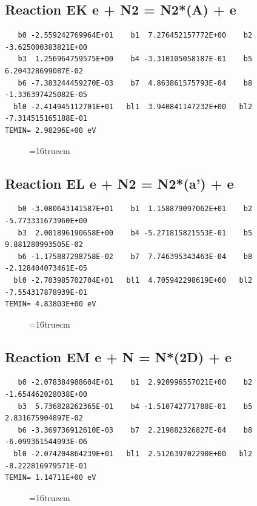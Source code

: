 \documentclass[12pt,dvipdfm]{article}
\begin{document}
\subsection{
Reaction EK e + N2 = N2*(A) + e}
\begin{small}\begin{verbatim}
   b0 -2.559242769964E+01    b1  7.276452157772E+00    b2 -3.625000383821E+00
   b3  1.256964759575E+00    b4 -3.310105058187E-01    b5  6.204328699087E-02
   b6 -7.383244459270E-03    b7  4.863861575793E-04    b8 -1.336397425082E-05
  bl0 -2.414945112701E+01   bl1  3.940841147232E+00   bl2 -7.314515165188E-01
TEMIN= 2.98296E+00 eV
   \end{verbatim}\end{small}
\begin{figure}[h!]
\label{n2rates}
\epsfxsize=16truecm
\end{figure}
\newpage

\subsection{
Reaction EL e + N2 = N2*(a') + e}
\begin{small}\begin{verbatim}
   b0 -3.080643141587E+01    b1  1.158879097062E+01    b2 -5.773331673960E+00
   b3  2.001896190658E+00    b4 -5.271815821553E-01    b5  9.881280993505E-02
   b6 -1.175887298758E-02    b7  7.746395343463E-04    b8 -2.128404073461E-05
  bl0 -2.703985702704E+01   bl1  4.705942298619E+00   bl2 -7.554317878939E-01
TEMIN= 4.83803E+00 eV
   \end{verbatim}\end{small}
\begin{figure}[h!]
\label{n2rates}
\epsfxsize=16truecm
\end{figure}
\newpage

\subsection{
Reaction EM e + N = N*(2D) + e}
\begin{small}\begin{verbatim}
   b0 -2.078384988604E+01    b1  2.920996557021E+00    b2 -1.654462028038E+00
   b3  5.736828262365E-01    b4 -1.510742771788E-01    b5  2.831675904897E-02
   b6 -3.369736912610E-03    b7  2.219882326827E-04    b8 -6.099361544993E-06
  bl0 -2.074204864239E+01   bl1  2.512639702290E+00   bl2 -8.222816979571E-01
TEMIN= 1.14711E+00 eV
   \end{verbatim}\end{small}
\begin{figure}[h!]
\label{n2rates}
\epsfxsize=16truecm
\end{figure}
\newpage
\end{document}
